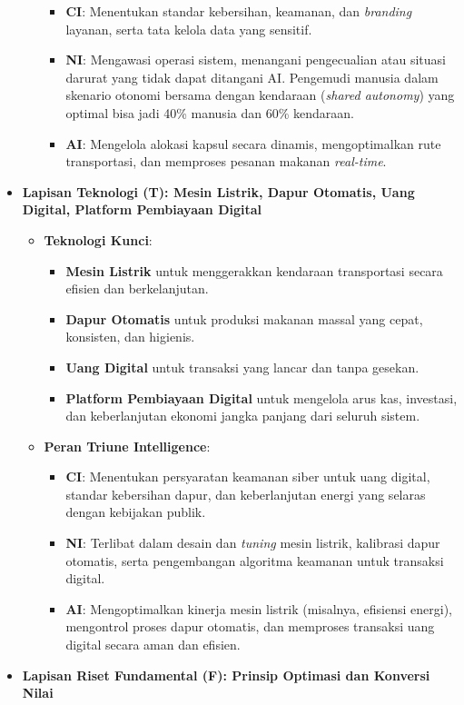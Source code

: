 \documentclass[
  letterpaper,
  DIV=11,
  numbers=noendperiod]{scrreprt}
\providecommand{\tightlist}{%
  \setlength{\itemsep}{0pt}\setlength{\parskip}{0pt}}
\begin{document}
\begin{itemize}
\begin{itemize}
    \begin{itemize}
    \tightlist
    \item
      \textbf{CI}: Menentukan standar kebersihan, keamanan, dan
      \emph{branding} layanan, serta tata kelola data yang sensitif.
    \item
      \textbf{NI}: Mengawasi operasi sistem, menangani pengecualian atau
      situasi darurat yang tidak dapat ditangani AI. Pengemudi manusia
      dalam skenario otonomi bersama dengan kendaraan (\emph{shared
      autonomy}) yang optimal bisa jadi 40\% manusia dan 60\% kendaraan.
    \item
      \textbf{AI}: Mengelola alokasi kapsul secara dinamis,
      mengoptimalkan rute transportasi, dan memproses pesanan makanan
      \emph{real-time}.
    \end{itemize}
  \end{itemize}
\item
  \textbf{Lapisan Teknologi (T): Mesin Listrik, Dapur Otomatis, Uang
  Digital, Platform Pembiayaan Digital}

  \begin{itemize}
  \tightlist
  \item
    \textbf{Teknologi Kunci}:

    \begin{itemize}
    \tightlist
    \item
      \textbf{Mesin Listrik} untuk menggerakkan kendaraan transportasi
      secara efisien dan berkelanjutan.
    \item
      \textbf{Dapur Otomatis} untuk produksi makanan massal yang cepat,
      konsisten, dan higienis.
    \item
      \textbf{Uang Digital} untuk transaksi yang lancar dan tanpa
      gesekan.
    \item
      \textbf{Platform Pembiayaan Digital} untuk mengelola arus kas,
      investasi, dan keberlanjutan ekonomi jangka panjang dari seluruh
      sistem.
    \end{itemize}
  \item
    \textbf{Peran Triune Intelligence}:

    \begin{itemize}
    \tightlist
    \item
      \textbf{CI}: Menentukan persyaratan keamanan siber untuk uang
      digital, standar kebersihan dapur, dan keberlanjutan energi yang
      selaras dengan kebijakan publik.
    \item
      \textbf{NI}: Terlibat dalam desain dan \emph{tuning} mesin
      listrik, kalibrasi dapur otomatis, serta pengembangan algoritma
      keamanan untuk transaksi digital.
    \item
      \textbf{AI}: Mengoptimalkan kinerja mesin listrik (misalnya,
      efisiensi energi), mengontrol proses dapur otomatis, dan memproses
      transaksi uang digital secara aman dan efisien.
    \end{itemize}
  \end{itemize}
\item
  \textbf{Lapisan Riset Fundamental (F): Prinsip Optimasi dan Konversi
  Nilai}


\end{itemize}
\end{document}
